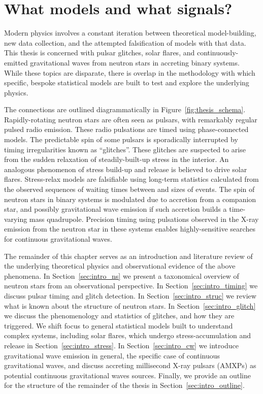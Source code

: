 \section{What models and what signals?}
Modern physics involves a constant iteration between theoretical model-building, new data collection, and the attempted falsification of models with that data. This thesis is concerned with pulsar glitches, solar flares, and continuously-emitted gravitational waves from neutron stars in accreting binary systems. While these topics are disparate, there is overlap in the methodology with which specific, bespoke statistical models are built to test and explore the underlying physics. 

The connections are outlined diagrammatically in Figure~\ref{fig:thesis_schema}. Rapidly-rotating neutron stars are often seen as pulsars, with remarkably regular pulsed radio emission. These radio pulsations are timed using phase-connected models. The predictable spin of some pulsars is sporadically interrupted by timing irregularities known as ``glitches''. These glitches are suspected to arise from the sudden relaxation of steadily-built-up stress in the interior. An analogous phenomenon of stress build-up and release is believed to drive solar flares. Stress-relax models are falsifiable using long-term statistics calculated from the observed sequences of waiting times between and sizes of events. The spin of neutron stars in binary systems is modulated due to accretion from a companion star, and possibly gravitational wave emission if such accretion builds a time-varying mass quadrupole. Precision timing using pulsations observed in the X-ray emission from the neutron star in these systems enables highly-sensitive searches for continuous gravitational waves. 

The remainder of this chapter serves as an introduction and literature review of the underlying theoretical physics and observational evidence of the above phenomena. In Section~\ref{sec:intro_ns} we present a taxonomical overview of neutron stars from an observational perspective. In Section~\ref{sec:intro_timing} we discuss pulsar timing and glitch detection. In Section~\ref{sec:intro_struc} we review what is known about the structure of neutron stars. In Section~\ref{sec:intro_glitch} we discuss the phenomenology and statistics of glitches, and how they are triggered. We shift focus to general statistical models built to understand complex systems, including solar flares, which undergo stress-accumulation and release in Section~\ref{sec:intro_stress}. In Section~\ref{sec:intro_cw} we introduce gravitational wave emission in general, the specific case of continuous gravitational waves, and discuss accreting millisecond X-ray pulsars (AMXPs) as potential continuous gravitational waves sources. Finally, we provide an outline for the structure of the remainder of the thesis in Section~\ref{sec:intro_outline}.

